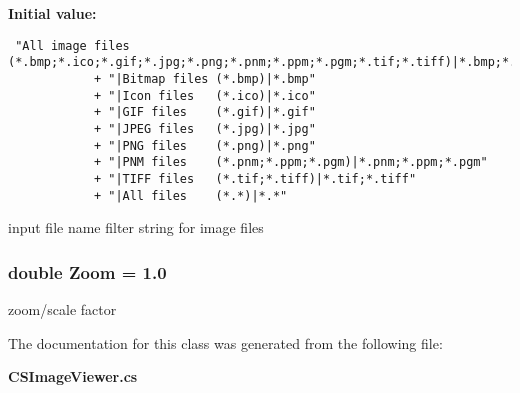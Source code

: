 {\bf Initial value:}

\footnotesize\begin{verbatim} "All image files (*.bmp;*.ico;*.gif;*.jpg;*.png;*.pnm;*.ppm;*.pgm;*.tif;*.tiff)|*.bmp;*.ico;*.gif;*.jpg;*.png;*.pnm;*.ppm;*.pgm;*.tif;*.tiff"
            + "|Bitmap files (*.bmp)|*.bmp"
            + "|Icon files   (*.ico)|*.ico"
            + "|GIF files    (*.gif)|*.gif"
            + "|JPEG files   (*.jpg)|*.jpg"
            + "|PNG files    (*.png)|*.png"
            + "|PNM files    (*.pnm;*.ppm;*.pgm)|*.pnm;*.ppm;*.pgm"
            + "|TIFF files   (*.tif;*.tiff)|*.tif;*.tiff"
            + "|All files    (*.*)|*.*"
\end{verbatim}\normalsize 
input file name filter string for image files 

\subsubsection{\setlength{\rightskip}{0pt plus 5cm}double {\bf Zoom} = 1.0\hspace{0.3cm}{\tt  [private]}}\label{class_c_s_image_viewer_1_1_c_s_image_viewer_0e089a5fee7fd471a09d154132e70d19}


zoom/scale factor 



The documentation for this class was generated from the following file:\begin{CompactItemize}
\item 
{\bf CSImage\-Viewer.cs}\end{CompactItemize}
